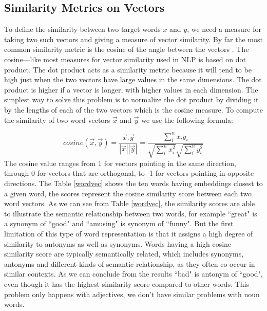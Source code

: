 \documentclass{article}
\begin{document}
\subsection{Similarity Metrics on Vectors}
To define the similarity between two target words $x$ and $y$, we need a measure for taking two such vectors and giving a measure of vector similarity. By far the most common similarity metric is the cosine of the angle between the vectors \cite{manning:1999}. The cosine—like most measures for vector similarity used in NLP is based on dot product. The dot product acts as a similarity metric because it will tend to be high just when the two vectors have large values in the same dimensions.
The dot product is higher if a vector is longer, with higher values in each dimension. The simplest way to solve this problem is to normalize the dot product by dividing it by the lengths of each of the two vectors which is the cosine measure.
To compute the similarity of two word vectors $\vec{x}$ and $\vec{y}$ we use the following formula:

$$cosine(\vec{x}, \vec{y})=\frac{\vec{x}. \vec{y}}{|\vec{x}| |\vec{y}|}= \frac{\sum_{i}^{n} x_{i}y_{i}}{\sqrt{\sum_{i}^{n}x_{i}^2} \sqrt{\sum_{i}^{n} y_{i}^2}}$$
The cosine value ranges from 1 for vectors pointing in the same direction, through 0 for vectors that are orthogonal, to -1 for vectors pointing in opposite directions.
The Table \ref{wordvec} shows the ten words having embeddings closest to a given word, the scores represent the cosine similarity score between each two word vectors.
As we can see from Table \ref{wordvec}, the similarity scores are able to illustrate the semantic relationship between two words, for example ``great" is a synonym of ``good" and ``amusing" is  synonym of ``funny". But the first limitation of this type of word representation is that it assigns a high degree of similarity to antonyms as well as synonyms. Words having a high cosine similarity score are typically semantically related, which includes synonyms, antonyms and different kinds of semantic relationship, as they often co-occur in similar contexts. As we can conclude from the results ``bad" is antonym of ``good", even though it has the highest similarity score compared to other words. This problem only happens with adjectives, we don't have similar problems with noun words.
\end{document}
